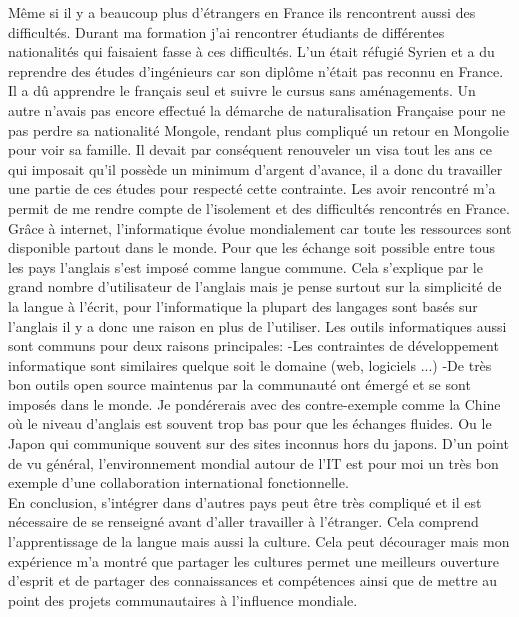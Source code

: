 \documentclass[french,a4paper,12pt]{report}
\begin{document}
Même si il y a beaucoup plus d'étrangers en France ils rencontrent aussi des difficultés. Durant ma formation j'ai rencontrer étudiants de différentes nationalités qui faisaient fasse à ces difficultés. L'un était réfugié Syrien et a du reprendre des études d'ingénieurs car son diplôme n'était pas reconnu en France. Il a dû apprendre le français seul et suivre le cursus sans aménagements.
Un autre n'avais pas encore effectué la démarche de naturalisation Française pour ne pas perdre sa nationalité Mongole, rendant plus compliqué un retour en Mongolie pour voir sa famille. Il devait par conséquent renouveler un visa tout les ans ce qui imposait qu'il possède un minimum d'argent d'avance, il a donc du travailler une partie de ces études pour respecté cette contrainte.
Les avoir rencontré m'a permit de me rendre compte de l'isolement et des difficultés rencontrés en France.\\

Grâce à internet, l’informatique évolue mondialement car toute les ressources sont disponible partout dans le monde. Pour que les échange soit possible entre tous les pays  l’anglais s’est imposé comme langue commune. Cela s’explique par le grand nombre d’utilisateur de l’anglais mais je pense surtout sur la simplicité de la langue à l’écrit, pour l’informatique la plupart des langages sont basés sur l’anglais il y a donc une raison en plus de l’utiliser.
Les outils informatiques aussi sont communs pour deux raisons principales:
-Les contraintes de développement informatique sont similaires quelque soit le domaine (web, logiciels ...)
-De très bon outils open source maintenus par la communauté ont émergé et se sont imposés dans le monde.
Je pondérerais avec des contre-exemple comme la Chine où le niveau d’anglais est souvent trop bas pour que les échanges fluides. Ou le Japon qui communique souvent sur des sites inconnus hors du japons. 
D’un point de vu général, l’environnement mondial autour de l’IT est pour moi un très bon exemple d’une collaboration international fonctionnelle.\\

En conclusion, s’intégrer dans d'autres pays peut être très compliqué et il est nécessaire de se renseigné avant d'aller travailler à l'étranger. Cela comprend l'apprentissage de la langue mais aussi la culture. Cela peut décourager mais mon expérience m'a montré que partager les cultures permet une meilleurs ouverture d'esprit et de partager des connaissances et compétences ainsi que de mettre au point des projets communautaires à l'influence mondiale.
\end{document}

